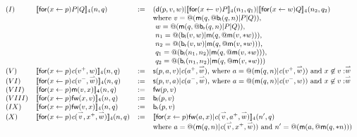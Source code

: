 \documentclass[submission,copyright,creativecommons]{eptcs}
\makeatletter
\newcommand{\ldb}{[\![}
\newcommand{\rdb}{]\!]}
\newcommand{\binpar}[2]{#1 | #2}
\newcommand{\prefix}[3]{\mathsf{for}(#2 \leftarrow #1) #3}
\newcommand{\quotep}[1]{\mathsf{@}#1}
\newcommand{\meaningof}[1]{\ldb #1 \rdb}
\newcommand{\vect}[1]{\stackrel{\rightharpoonup}{#1}}
\theoremstyle{definition}
\theoremstyle{remark}
\theoremstyle{remark}
\makeatother
\begin{document}
\[\small
\begin{array}{llrl}
(I)&  \meaningof{\prefix{p}{x}{\binpar{P}{Q}}}_4(n, q) 
    & := & 
    (\mathsf{d}(p,v,w)|\binpar{\meaningof{\prefix{v}{x}{P}}_{4}(n_{1}, q_{1})}{\meaningof{\prefix{w}{x}{Q}}_{4}(n_{2}, q_{2}) } \\
& & & \mbox{where $v = \quotep{(\mathsf{m}(q,\quotep{\binpar{\mathsf{b}_{\mathsf{l}}(q,n)}{\binpar{P}{Q}}}))}$,} \\
& & & \mbox{     $w = \quotep{(\mathsf{m}(q,\quotep{\binpar{\mathsf{b}_{\mathsf{r}}(q,n)}{\binpar{P}{Q}}}))}$,} \\
& & &\mbox{     $n_{1} = \quotep{(\binpar{\mathsf{b}_{\mathsf{l}}(v,w)}{\mathsf{m}(q,\quotep{\mathsf{m}(v,*w)})})}$,} \\
& & &\mbox{     $n_{2} = \quotep{(\binpar{\mathsf{b}_{\mathsf{r}}(v,w)}{\mathsf{m}(q,\quotep{\mathsf{m}(v,*w)})})}$,} \\
& & &\mbox{     $q_{1} = \quotep{(\binpar{\mathsf{b}_{\mathsf{l}}(n_{1},n_{2})}{\mathsf{m}(q,\quotep{\mathsf{m}(v,*w)})})}$,} \\
& & & \mbox{     $q_{2} = \quotep{(\binpar{\mathsf{b}_{\mathsf{r}}(n_{1},n_{2})}{\mathsf{m}(q,\quotep{\mathsf{m}(v,*w)})})}$ }\\
(V)&  \meaningof{\prefix{p}{x}{\emph{c}(v^{+},w)}}_4(n, q) 
    & := & 
    \mathsf{s}(p,a,v)|\emph{c}(a^{+},\vect{w})
    \mbox{, where $a = @(\binpar{\mathsf{m}(q,n)}{\emph{c}(v^{+},\vect{w})})$ and $x \not\in v : \vect{w}$}\\
(VI)&  \meaningof{\prefix{p}{x}{\emph{c}(v^{-},\vect{w})}}_4(n, q) 
    & := & 
    \mathsf{s}(p,v,a)|\emph{c}(a^{-},\vect{w})
    \mbox{, where $a = @(\mathsf{m}(q,n)|\emph{c}(v^{-},w))$ and $x \not\in v : \vect{w}$} \\
(VII)&  \meaningof{\prefix{p}{x}{\mathsf{m}(v,x)}}_4(n, q) 
    & := & 
    \mathsf{fw}(p,v) \\
(VIII)&  \meaningof{\prefix{p}{x}{\mathsf{fw}(x,v)}}_4(n, q) 
    & := & 
    \mathsf{b}_{\mathsf{l}}(p,v) \\
(IX)&  \meaningof{\prefix{p}{x}{\mathsf{fw}(v,x)}}_4(n, q) 
    & := & 
    \mathsf{b}_{\mathsf{r}}(p,v) \\
(X)&  \meaningof{\prefix{p}{x}{\emph{c}(\vect{v},x^{+},\vect{w})}}_4(n, q) 
    & := & 
    \meaningof{\prefix{p}{x}{\binpar{\mathsf{fw}(a,x)}{\emph{c}(\vect{v},a^{+},\vect{w})}}}_4(n', q)\\
    & & & \mbox{where $a = @(\binpar{\mathsf{m}(q,n)}{\emph{c}(\vect{v},x^{+},\vect{w})})$} \mbox{ and $n'= \quotep{(\mathsf{m}(a,\quotep{\mathsf{m}(q,*n)}))}$} \\

\end{array}\]
\end{document}
